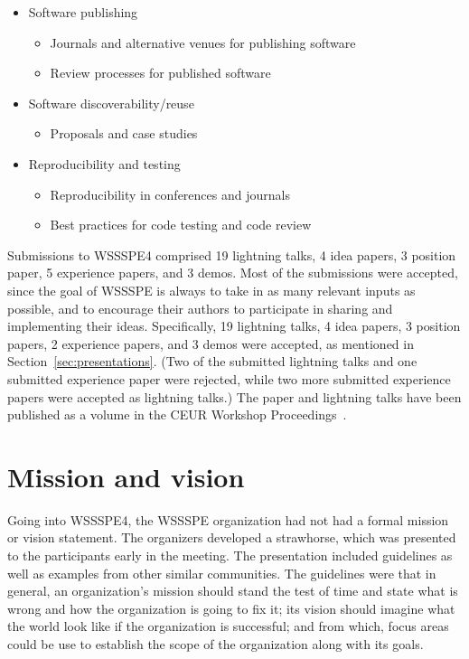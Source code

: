 \documentclass[11pt, oneside]{amsart}
\newcommand{\note}[1]{ {\textcolor{blueish}    { ***Note:      #1 }}}
\begin{document}
\begin{itemize}
\item Software publishing
\begin{itemize}
    \item Journals and alternative venues for publishing software
    \item Review processes for published software
\end{itemize}

\item Software discoverability/reuse
\begin{itemize}
    \item Proposals and case studies
\end{itemize}

\item Reproducibility and testing
\begin{itemize}
    \item Reproducibility in conferences and journals
    \item Best practices for code testing and code review
\end{itemize}

\end{itemize}

Submissions to WSSSPE4 comprised
19 lightning talks,
4 idea papers,
3 position paper,
5 experience papers,
and
3 demos.
Most of the submissions were accepted, since the goal of WSSSPE is always to
take in as many relevant inputs as possible, and to encourage their authors to
participate in sharing and implementing their ideas.
Specifically,
19 lightning talks,
4 idea papers,
3 position papers,
2 experience papers,
and
3 demos
were accepted, as mentioned in Section~\ref{sec:presentations}. (Two of the submitted lightning talks and one submitted experience paper were rejected, while two more submitted experience papers
were accepted as lightning talks.)
The paper and lightning talks have been published as a volume in the CEUR Workshop Proceedings~\cite{WSSSPE4-proceedings}.

\section{Mission and vision}\label{sec:mission}


Going into WSSSPE4, the WSSSPE organization had not had a formal mission or vision statement.
The organizers developed a strawhorse, which was presented to the participants early in the meeting.
The presentation included guidelines as well as examples from other similar communities.
The guidelines were that in general, an organization's mission should stand the test of time and state what is wrong and how the organization is going to fix it; its vision should imagine what the world look like if the organization is successful; and from which, focus areas could be use to establish the scope of the organization along with its goals.
\end{document}
